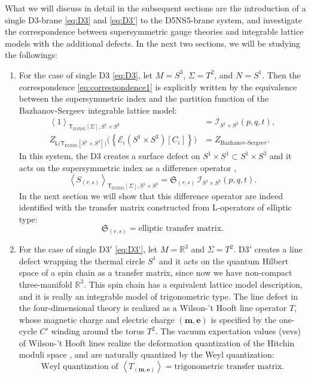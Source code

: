 What we will discuss in detail in the subsequent sections
are the introduction of a single D3-brane \eqref{eq:D3} and \eqref{eq:D3'} to the
D5NS5-brane system, and investigate the correspondence between supersymmetric gauge theories
and integrable lattice models with the additional
defects. In the next two sections, we will be studying the followings:
\begin{enumerate}
	\item For the case of single D3 \eqref{eq:D3}, let $M=S^{3}$, $\Sigma=T^{2}$, and $N=S^{1}$.
Then the correspondence \eqref{eq:correspondence1} is explicitly written by the equivalence between
the supersymmetric index and the partition function of the Bazhanov-Sergeev integrable lattice model:
\begin{align}
  \left\langle  1  \right\rangle_{\mathsf{T}_{\mathrm{D5NS5}}[\Sigma],S^{1}\times S^{3}}
    &  =  \mathcal{I}_{S^{1}\times S^{3}}(p,q,t),\\
  Z_{\mathsf{L}\big(\mathsf{T}_{\mathrm{D5NS5}}[S^{1}\times S^{3}]\big)}
    \big( \left\{ \mathcal{E}_{i}(S^{1}\times S^{3})[C_i]\right\} \big)
    &  =  Z_{\text{Bazhanov-Sergeev}}.
\end{align}
In this system, the D3 creates a surface defect on $S^{1}\times S^{1} \subset S^1\times S^3$ and it
acts on the supersymmetric index as a difference operator \cite{Gaiotto:2012xa,Gadde:2013dda},
\begin{equation}
  \left\langle S_{(r,s)}\right\rangle_{\mathsf{T}_{\mathrm{D5NS5}}[\Sigma], S^1\times S^3}
    =
      \mathfrak{S}_{(r,s)} \, \mathcal{I}_{S^{1}\times S^{3}}(p,q,t).
\end{equation}
In the next section we will show that this difference operator are indeed identified with
the transfer matrix constructed from L-operators of elliptic type:
\begin{equation}
  \mathfrak{S}_{(r,s)}
  = \textrm{elliptic transfer matrix.}
\end{equation}
\item For the case of single D3$'$ \eqref{eq:D3'}, let $M=\mathbb{R}^{3}$ and $\Sigma=T^{2}$.
D3$'$ creates a line defect wrapping the thermal circle $S^{1}$ and it acts on the quantum
Hilbert space of a spin chain as a transfer matrix, since now we have
non-compact three-manifold $\mathbb{R}^{3}$.
This spin chain has a equivalent lattice model description, and it is really an integrable model of
trigonometric type. The line defect in the
four-dimensional theory is realized as a Wilson-'t Hooft line operator
$T$, whose magnetic charge and electric charge $(\mathbf{m},\mathbf{e})$
is specified by the one-cycle $C'$ winding around the torus $T^{2}$.
The vacuum expectation values (vevs) of Wilson-'t Hooft
lines realize the deformation quantization of the Hitchin moduli space \cite{Ito:2011ea},
and are naturally quantized by the Weyl quantization:
\begin{equation}
  \textrm{Weyl quantization of }  \left\langle  T_{\left(\mathbf{m},\mathbf{e}\right)}  \right\rangle
  =  \textrm{trigonometric transfer matrix.}
\end{equation}
\end{enumerate}
%






